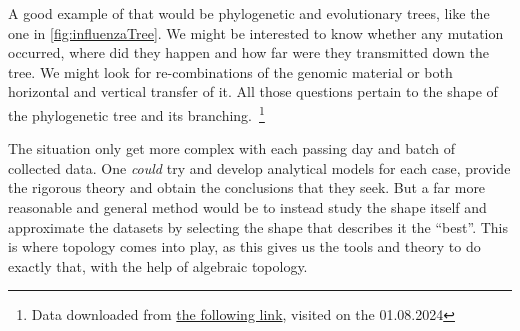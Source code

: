 A good example of that would be phylogenetic and evolutionary trees, like the one in \ref{fig:influenzaTree}. We might be interested to know whether any mutation occurred, where did they happen and how far were they transmitted down the tree. We might look for re-combinations of the genomic material or both horizontal and vertical transfer of it. All those questions pertain to the shape of the phylogenetic tree and its branching.\
\footnote{Data downloaded from \href{https://datadryad.org/stash/dataset/doi:10.5061/dryad.v15v0}{the following link},
visited on the 01.08.2024}
\par
The situation only get more complex with each passing day and batch of collected data. One \textit{could} try and develop analytical models for each case, provide the rigorous theory and obtain the conclusions that they seek. But a far more reasonable and general method would be to instead study the shape itself and approximate the datasets by selecting the shape that describes it the ``best''. This is where topology comes into play, as this gives us the tools and theory to do exactly that, with the help of algebraic topology.
